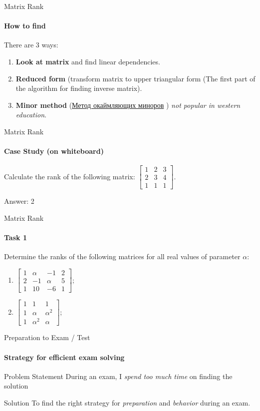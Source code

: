 \documentclass[aspectratio=169,notes]{beamer}
\begin{document}
\begin{frame}[t]{Matrix Rank}
\framesubtitle{How to find}
    There are 3 ways:
    \begin{enumerate}
        \item \textbf{Look at matrix} and find linear dependencies.
        \item \textbf{Reduced form} (transform matrix to upper triangular form (The first part of the algorithm for finding inverse matrix).
        \item \textbf{Minor method} (\href{http://www.mathprofi.ru/rang_matricy.html}{Метод окаймляющих миноров} ) \textit{not popular in western education}.
    \end{enumerate}
\end{frame}

\begin{frame}[t]{Matrix Rank}
\framesubtitle{Case Study (on whiteboard)}
Calculate the rank of the following matrix: $\begin{bmatrix}1&2&3\\2&3&4\\1&1&1\end{bmatrix}$. \medskip

\alert{\Large Answer: 2}
\end{frame}

\begin{frame}[t]{Matrix Rank}
\framesubtitle{Task 1}
Determine the ranks of the following matrices for all real values of parameter $\alpha$:
\begin{enumerate}

    \item $\begin{bmatrix}1&\alpha&-1&2\\2&-1&\alpha&5\\1&10&-6&1\end{bmatrix}$;
    \item $\begin{bmatrix}1&1&1\\1&\alpha&\alpha^2\\1&\alpha^2&\alpha\end{bmatrix}$;
\end{enumerate}
\end{frame}

\begin{frame}[t]{Preparation to Exam / Test}
\framesubtitle{Strategy for efficient exam solving}
\begin{exampleblock}{Problem Statement}
    During an exam, I \textit{spend too much time} on finding the solution
\end{exampleblock}
\begin{alertblock}{Solution}
    To find the right strategy for \textit{preparation} and \textit{behavior} during an exam.
\end{alertblock}
\end{frame}
\end{document}
